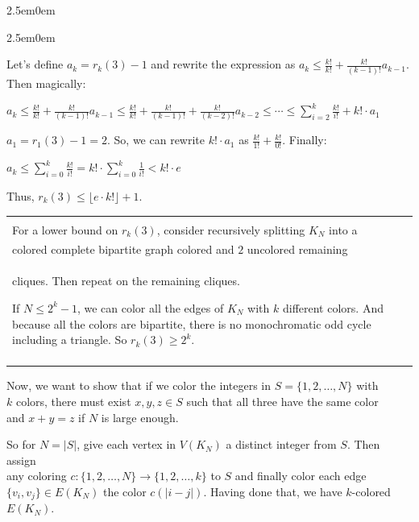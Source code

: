 \documentclass{book}
\newcommand{\teachComment}{
   \color{Orange}%
   \fontsize{12}{14}\selectfont%
}
\newenvironment{myIndent}{%
   \begin{adjustwidth}{2.5em}{0em}%
}{%
   \end{adjustwidth}%
}
\newenvironment{myClosureOne}[2][.]{%
   \color{#1}%
   \begin{tabular}{|p{#2in}|} \hline \\%
}{%
   \\ \hline \end{tabular}%
}
\newcommand{\retTwo}{\hfill\bigbreak}
\begin{document}
{\begin{myIndent}
{\begin{myIndent}
      Let's define $a_k = r_k(3) - 1$ and rewrite the expression as $a_k \leq \frac{k!}{k!} + \frac{k!}{(k-1)!}a_{k-1}$.\\ Then magically:

      {\center $ a_k \leq \frac{k!}{k!} + \frac{k!}{(k-1)!}a_{k-1} \leq \frac{k!}{k!} + \frac{k!}{(k-1)!} + \frac{k!}{(k-2)!}a_{k-2} \leq \cdots \leq \sum\limits_{i=2}^k\frac{k!}{i!} + k!\cdot a_{1}$\retTwo\par}

      $a_1 = r_1(3) - 1 = 2$. So, we can rewrite $k!\cdot a_{1}$ as $\frac{k!}{1!} + \frac{k!}{0!}$. Finally:

      {\center $ a_k \leq \sum\limits_{i=0}^k\frac{k!}{i!} = k! \cdot \sum\limits_{i=0}^k\frac{1}{i!} < k!\cdot e$\retTwo\par}

      Thus, $r_k(3) \leq \lfloor e\cdot k! \rfloor + 1$. \retTwo

      {\begin{center} \teachComment
         \begin{myClosureOne}{5}
            For a lower bound on $r_k(3)$, consider recursively splitting $K_N$ into a\\ colored complete bipartite graph colored and $2$ uncolored remaining\\ cliques. Then repeat on the remaining cliques.\retTwo

            If $N \leq 2^k - 1$, we can color all the edges of $K_N$ with $k$ different colors. And because all the colors are bipartite, there is no monochromatic odd cycle including a triangle. So $r_k(3) \geq 2^k$.\\
         \end{myClosureOne}
         \retTwo \retTwo
      \end{center}}
   \end{myIndent}}

   Now, we want to show that if we color the integers in $S = \{1, 2, \ldots, N\}$ with\\ $k$ colors, there must exist $x, y, z \in S$ such that all three have the same color\\ and $x + y = z$ if $N$ is large enough. \retTwo

   So for $N = |S|$, give each vertex in $V(K_N)$ a distinct integer from  $S$. Then assign\\ any coloring $c: \{1, 2, \ldots, N\} \rightarrow \{1, 2, \ldots, k\}$ to $S$ and finally color each edge\\ $\{v_i, v_j\} \in E(K_N)$ the color $c(|i-j|)$. Having done that, we have $k$-colored\\ $E(K_N)$.


\end{myIndent}}
\end{document}
